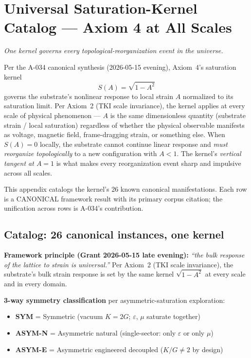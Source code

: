 \chapter{Universal Saturation-Kernel Catalog --- Axiom 4 at All Scales}
\label{app:universal_saturation_kernel}

\textit{One kernel governs every topological-reorganization event in the universe.}

\vspace{1em}

Per the A-034 canonical synthesis (2026-05-15 evening),
Axiom~4's saturation kernel
\begin{equation}
S(A) = \sqrt{1 - A^2}
\label{eq:universal_kernel}
\end{equation}
governs the substrate's nonlinear response to local strain $A$ normalized
to its saturation limit. Per Axiom~2 (TKI scale invariance), the kernel
applies at every scale of physical phenomenon --- $A$ is the same
dimensionless quantity (substrate strain / local saturation) regardless
of whether the physical observable manifests as voltage, magnetic field,
frame-dragging strain, or something else. When $S(A) = 0$ locally, the
substrate cannot continue linear response and \emph{must reorganize
topologically} to a new configuration with $A < 1$. The kernel's
\emph{vertical tangent at $A = 1$} is what makes every reorganization
event sharp and impulsive across all scales.

This appendix catalogs the kernel's 26 known canonical manifestations.
Each row is a CANONICAL framework result with its primary corpus
citation; the unification across rows is A-034's contribution.

\section{Catalog: 26 canonical instances, one kernel}
\label{sec:saturation_kernel_catalog}

\textbf{Framework principle (Grant 2026-05-15 late evening):} \emph{``the
bulk response of the lattice to strain is universal.''} Per Axiom~2 (TKI
scale invariance), the substrate's bulk strain response is set by the
same kernel $\sqrt{1-A^2}$ at every scale and in every domain.

\textbf{3-way symmetry classification} per asymmetric-saturation
exploration:
\begin{itemize}
    \item \textbf{SYM} = Symmetric (vacuum $K = 2G$; $\varepsilon$, $\mu$ saturate together)
    \item \textbf{ASYM-N} = Asymmetric natural (single-sector: only $\varepsilon$ or only $\mu$)
    \item \textbf{ASYM-E} = Asymmetric engineered decoupled ($K/G \neq 2$ by design)
\end{itemize}


